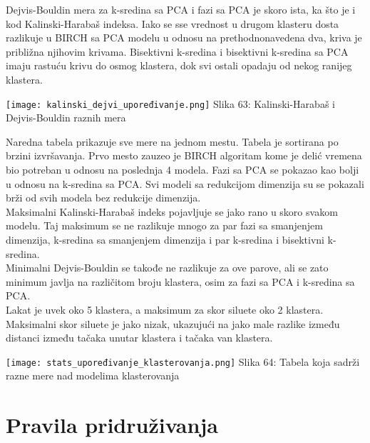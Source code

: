 \documentclass[a4paper]{article}
\begin{document}
{Dejvis-Bouldin mera za k-sredina sa PCA i fazi sa PCA je skoro ista, ka što je i kod Kalinski-Harabaš indeksa. Iako se sse vrednost u drugom klasteru dosta razlikuje u BIRCH sa PCA modelu u odnosu na prethodnonavedena dva, kriva je približna njihovim krivama. Bisektivni k-sredina i bisektivni k-sredina sa PCA imaju rastuću krivu do osmog klastera, dok svi ostali opadaju od nekog ranijeg klastera.

\noindent\begin{minipage}{0.9\textwidth}
\texttt{[image: kalinski\_dejvi\_upoređivanje.png]}
\hphantom{aaaaaaaaaaaaa}Slika 63: Kalinski-Harabaš i Dejvis-Bouldin raznih mera\\
\end{minipage}

Naredna tabela prikazuje sve mere na jednom mestu. Tabela je sortirana po brzini izvršavanja. Prvo mesto zauzeo je BIRCH algoritam kome je delić vremena bio potreban u odnosu na poslednja 4 modela. Fazi sa PCA se pokazao kao bolji u odnosu na k-sredina sa PCA. Svi modeli sa redukcijom dimenzija su se pokazali brži od svih modela bez redukcije dimenzija.\\

Maksimalni Kalinski-Harabaš indeks pojavljuje se jako rano u skoro svakom modelu. Taj maksimum se ne razlikuje mnogo za par fazi sa smanjenjem dimenzija, k-sredina sa smanjenjem dimenzija i par k-sredina i bisektivni k-sredina.\\

Minimalni Dejvis-Bouldin se takođe ne razlikuje za ove parove, ali se zato minimum javlja na različitom broju klastera, osim za fazi sa PCA i k-sredina sa PCA.\\

Lakat je uvek oko 5 klastera, a maksimum za skor siluete oko 2 klastera. Maksimalni skor siluete je jako nizak, ukazujući na jako male razlike između distanci između tačaka unutar klastera i tačaka van klastera.\\

\noindent\begin{minipage}{1.0\textwidth}
\texttt{[image: stats\_upoređivanje\_klasterovanja.png]}
\hphantom{aaaaaaaaa}Slika 64: Tabela koja sadrži razne mere nad modelima klasterovanja\\
\end{minipage}

\section{Pravila pridruživanja}
\label{sec:pravila}

}
\end{document}
